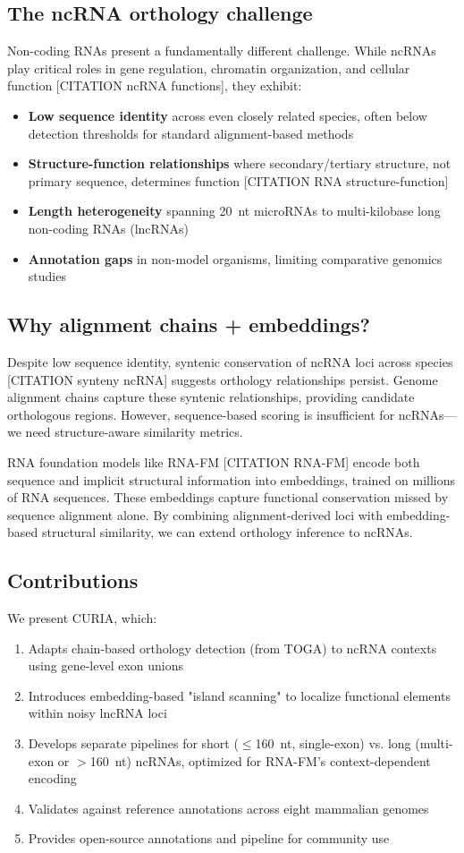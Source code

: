 \documentclass[11pt]{article}
\begin{document}
\subsection{The ncRNA orthology challenge}
Non-coding RNAs present a fundamentally different challenge. While ncRNAs play critical roles in gene regulation, chromatin organization, and cellular function [CITATION ncRNA functions], they exhibit:
\begin{itemize}
\item \textbf{Low sequence identity} across even closely related species, often below detection thresholds for standard alignment-based methods
\item \textbf{Structure-function relationships} where secondary/tertiary structure, not primary sequence, determines function [CITATION RNA structure-function]
\item \textbf{Length heterogeneity} spanning 20~nt microRNAs to multi-kilobase long non-coding RNAs (lncRNAs)
\item \textbf{Annotation gaps} in non-model organisms, limiting comparative genomics studies
\end{itemize}

\subsection{Why alignment chains + embeddings?}
Despite low sequence identity, syntenic conservation of ncRNA loci across species [CITATION synteny ncRNA] suggests orthology relationships persist. Genome alignment chains capture these syntenic relationships, providing candidate orthologous regions. However, sequence-based scoring is insufficient for ncRNAs—we need structure-aware similarity metrics.

RNA foundation models like RNA-FM [CITATION RNA-FM] encode both sequence and implicit structural information into embeddings, trained on millions of RNA sequences. These embeddings capture functional conservation missed by sequence alignment alone. By combining alignment-derived loci with embedding-based structural similarity, we can extend orthology inference to ncRNAs.

\subsection{Contributions}
We present CURIA, which:
\begin{enumerate}
\item Adapts chain-based orthology detection (from TOGA) to ncRNA contexts using gene-level exon unions
\item Introduces embedding-based "island scanning" to localize functional elements within noisy lncRNA loci
\item Develops separate pipelines for short ($\leq$160~nt, single-exon) vs. long (multi-exon or $>$160~nt) ncRNAs, optimized for RNA-FM's context-dependent encoding
\item Validates against reference annotations across eight mammalian genomes
\item Provides open-source annotations and pipeline for community use
\end{enumerate}
\end{document}
